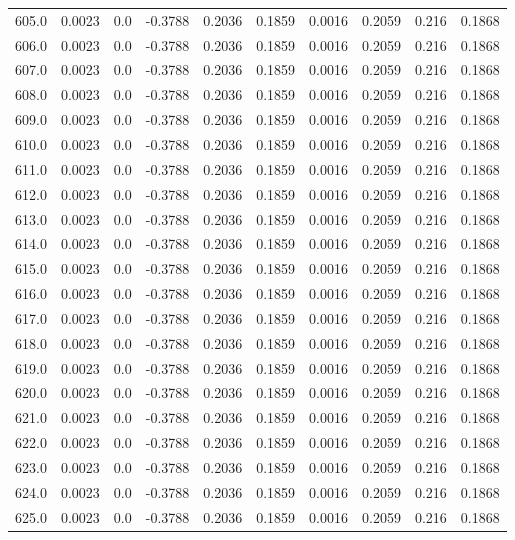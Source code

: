 \begin{longtable}{lrrrrrrrrr}
605.0 & 0.0023 & 0.0 & -0.3788 & 0.2036 & 0.1859 & 0.0016 & 0.2059 & 0.216 & 0.1868 \\
606.0 & 0.0023 & 0.0 & -0.3788 & 0.2036 & 0.1859 & 0.0016 & 0.2059 & 0.216 & 0.1868 \\
607.0 & 0.0023 & 0.0 & -0.3788 & 0.2036 & 0.1859 & 0.0016 & 0.2059 & 0.216 & 0.1868 \\
608.0 & 0.0023 & 0.0 & -0.3788 & 0.2036 & 0.1859 & 0.0016 & 0.2059 & 0.216 & 0.1868 \\
609.0 & 0.0023 & 0.0 & -0.3788 & 0.2036 & 0.1859 & 0.0016 & 0.2059 & 0.216 & 0.1868 \\
610.0 & 0.0023 & 0.0 & -0.3788 & 0.2036 & 0.1859 & 0.0016 & 0.2059 & 0.216 & 0.1868 \\
611.0 & 0.0023 & 0.0 & -0.3788 & 0.2036 & 0.1859 & 0.0016 & 0.2059 & 0.216 & 0.1868 \\
612.0 & 0.0023 & 0.0 & -0.3788 & 0.2036 & 0.1859 & 0.0016 & 0.2059 & 0.216 & 0.1868 \\
613.0 & 0.0023 & 0.0 & -0.3788 & 0.2036 & 0.1859 & 0.0016 & 0.2059 & 0.216 & 0.1868 \\
614.0 & 0.0023 & 0.0 & -0.3788 & 0.2036 & 0.1859 & 0.0016 & 0.2059 & 0.216 & 0.1868 \\
615.0 & 0.0023 & 0.0 & -0.3788 & 0.2036 & 0.1859 & 0.0016 & 0.2059 & 0.216 & 0.1868 \\
616.0 & 0.0023 & 0.0 & -0.3788 & 0.2036 & 0.1859 & 0.0016 & 0.2059 & 0.216 & 0.1868 \\
617.0 & 0.0023 & 0.0 & -0.3788 & 0.2036 & 0.1859 & 0.0016 & 0.2059 & 0.216 & 0.1868 \\
618.0 & 0.0023 & 0.0 & -0.3788 & 0.2036 & 0.1859 & 0.0016 & 0.2059 & 0.216 & 0.1868 \\
619.0 & 0.0023 & 0.0 & -0.3788 & 0.2036 & 0.1859 & 0.0016 & 0.2059 & 0.216 & 0.1868 \\
620.0 & 0.0023 & 0.0 & -0.3788 & 0.2036 & 0.1859 & 0.0016 & 0.2059 & 0.216 & 0.1868 \\
621.0 & 0.0023 & 0.0 & -0.3788 & 0.2036 & 0.1859 & 0.0016 & 0.2059 & 0.216 & 0.1868 \\
622.0 & 0.0023 & 0.0 & -0.3788 & 0.2036 & 0.1859 & 0.0016 & 0.2059 & 0.216 & 0.1868 \\
623.0 & 0.0023 & 0.0 & -0.3788 & 0.2036 & 0.1859 & 0.0016 & 0.2059 & 0.216 & 0.1868 \\
624.0 & 0.0023 & 0.0 & -0.3788 & 0.2036 & 0.1859 & 0.0016 & 0.2059 & 0.216 & 0.1868 \\
625.0 & 0.0023 & 0.0 & -0.3788 & 0.2036 & 0.1859 & 0.0016 & 0.2059 & 0.216 & 0.1868 \\

\end{longtable}
